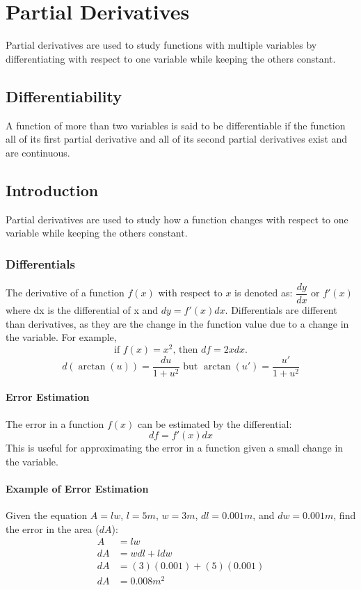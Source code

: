 \chapter{Partial Derivatives}
Partial derivatives are used to study functions with multiple variables by differentiating with respect to one variable while keeping the others constant.

\section{Differentiability}
A function of more than two variables is said to be
differentiable if the function all of its first partial
derivative and all of its second partial derivatives exist
and are continuous.

\section{Introduction}
Partial derivatives are used to study how a function changes with respect to one variable while keeping the others constant.

\subsection{Differentials}
The derivative of a function \(f(x)\) with respect to \(x\) is denoted as: $\dfrac{dy}{dx}$ or $f'(x)$ where dx is the differential of x and $dy = f'(x)dx$.
Differentials are different than derivatives, as they are the change in the function value due to a change in the variable. For example,
\[
\text{if }f(x) = x^2\text{, then } df = 2xdx\text{.}
\]
\[
d(\arctan(u)) = \dfrac{du}{1+u^2}\text{ but }\arctan(u') = \dfrac{u'}{1+u^2}
\]

\subsubsection{Error Estimation}
The error in a function \(f(x)\) can be estimated by the differential:
\begin{equation}\label{Error Estimation}
    df = f'(x)dx
\end{equation}
This is useful for approximating the error in a function given a small change in the variable.

\subsubsection{Example of Error Estimation}
Given the equation $A = lw$, $l = 5m$, $w = 3m$, $dl = 0.001m$, and $dw = 0.001m$, find the error in the area ($dA$): 
\begin{align*}
    A &= lw\\
    dA &= wdl + ldw\\
    dA &= (3)(0.001) + (5)(0.001)\\
    dA &= 0.008m^2
\end{align*}
